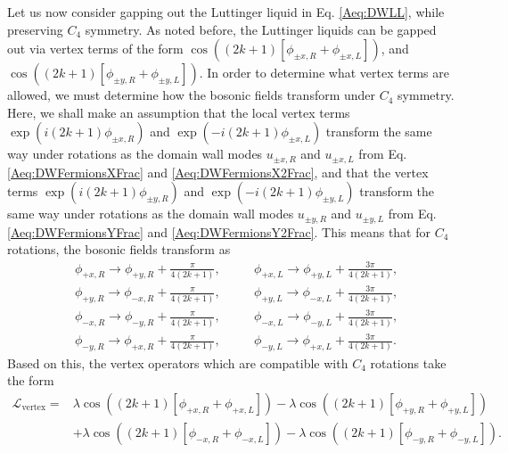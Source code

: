\documentclass[%
 reprint,
 amsmath,amssymb,
 aps,
]{revtex4-1}
\begin{document}
\begin{appendix}
Let us now consider gapping out the Luttinger liquid in Eq. \ref{Aeq:DWLL}, while preserving $C_4$ symmetry. As noted before, the Luttinger liquids can be gapped out via vertex terms of the form $\cos((2k+1)[\phi_{\pm x,R}+\phi_{\pm x,L}])$, and $\cos((2k+1)[\phi_{\pm y,R}+\phi_{\pm y,L}])$. In order to determine what vertex terms are allowed, we must determine how the bosonic fields transform under $C_4$ symmetry. Here, we shall make an assumption that the local vertex terms $\exp(i (2k+1)\phi_{\pm x,R})$ and $\exp(-i (2k+1)\phi_{\pm x,L})$ transform the same way under rotations as the domain wall modes $u_{\pm x,R}$ and $u_{\pm x,L}$ from Eq. \ref{Aeq:DWFermionsXFrac} and \ref{Aeq:DWFermionsX2Frac}, and that the vertex terms $\exp(i (2k+1)\phi_{\pm y,R})$ and $\exp(-i (2k+1)\phi_{\pm y,L})$ transform the same way under rotations as the domain wall modes $u_{\pm y,R}$ and $u_{\pm y,L}$ from Eq. \ref{Aeq:DWFermionsYFrac} and \ref{Aeq:DWFermionsY2Frac}. This means that for $C_4$ rotations, the bosonic fields transform as
\begin{equation}\begin{split}
&\phi_{+x,R} \rightarrow \phi_{+y,R} + \frac{\pi}{4(2k+1)}, \phantom{==} \phi_{+x,L} \rightarrow \phi_{+y,L} + \frac{3\pi}{4(2k+1)},\\
&\phi_{+y,R} \rightarrow \phi_{-x,R} + \frac{\pi}{4(2k+1)}, \phantom{==} \phi_{+y,L} \rightarrow \phi_{-x,L} + \frac{3\pi}{4(2k+1)},\\
&\phi_{-x,R} \rightarrow \phi_{-y,R} + \frac{\pi}{4(2k+1)}, \phantom{==} \phi_{-x,L} \rightarrow \phi_{-y,L} + \frac{3\pi}{4(2k+1)},\\
&\phi_{-y,R} \rightarrow \phi_{+x,R} + \frac{\pi}{4(2k+1)}, \phantom{==} \phi_{-y,L} \rightarrow \phi_{+x,L} + \frac{3\pi}{4(2k+1)}.
\end{split}\end{equation}
Based on this, the vertex operators which are compatible with $C_4$ rotations take the form 
\begin{equation}\begin{split}
\mathcal{L}_{\text{vertex}} = &\lambda \cos((2k+1)[\phi_{+x,R}+\phi_{+x,L}]) - \lambda \cos((2k+1)[\phi_{+ y,R}+\phi_{+y,L}])\\&  + \lambda \cos((2k+1)[\phi_{-x,R}+\phi_{- x,L}])  - \lambda \cos((2k+1)[\phi_{-y,R}+\phi_{-y,L}]).
\end{split}\end{equation}

\end{appendix}
\end{document}
